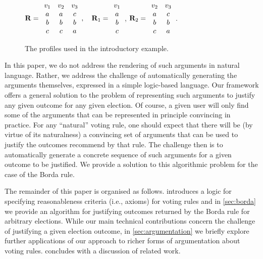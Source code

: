 \documentclass{comsoc2016}
\begin{document}
\begin{figure}
	\centering
	$
	\mathbf{R} =
	\begin{array}{ccc}
		v_1&v_2&v_3\\
		a&a&c\\
		b&b&b\\
		c&c&a\\
	\end{array},\quad
	\mathbf{R}_1 =
	\begin{array}{c}
		v_1\\
		a\\
		b\\
		c\\
	\end{array}$,\quad
	$
	\mathbf{R}_2 =
	\begin{array}{cc}
		v_2&v_3\\
		a&c\\
		b&b\\
		c&a\\
	\end{array} 
	$.
        \vspace{-5pt}
	\caption{The profiles used in the introductory example.} %
	\label{fig:introProfs}
\end{figure}

In this paper, we do not address the rendering of such arguments in natural language. Rather, we address the challenge of automatically generating the arguments themselves, expressed in a simple logic-based language. Our framework offers a general solution to the problem of representing such arguments to justify any given outcome for any given election. Of course, a given user will only find some of the arguments that can be represented in principle convincing in practice. For any ``natural'' voting rule, one should expect that there will be (by virtue of its naturalness) a convincing set of arguments that can be used to justify the outcomes recommend by that rule. The challenge then is to automatically generate a concrete sequence of such arguments for a given outcome to be justified. We provide a solution to this algorithmic problem for the case of the Borda rule. 

The remainder of this paper is organised as follows. 
 introduces a logic for specifying reasonableness criteria (i.e., axioms) for voting rules and
in \cref{sec:borda} we provide an algorithm for justifying outcomes returned by the Borda rule for arbitrary elections. 
While our main technical contributions concern the challenge of justifying a given election outcome, in \cref{sec:argumentation} we briefly explore further applications of our approach to richer forms of argumentation about voting rules. 
 concludes with a discussion of related work. %
\end{document}
